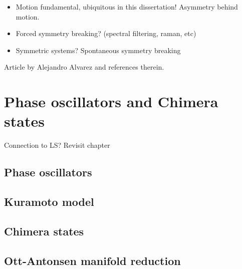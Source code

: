 \begin{itemize}
    \item Motion fundamental, ubiquitous in this dissertation! Asymmetry behind motion.
    \item Forced symmetry breaking? (spectral filtering, raman, etc)
    \item Symmetric systems? Spontaneous symmetry breaking
\end{itemize}

Article by Alejandro Alvarez and references therein.

\section{Phase oscillators and Chimera states}
Connection to LS?  Revisit chapter
\subsection{Phase oscillators}
\label{sec:phase_oscillators}

\subsection{Kuramoto model}

\subsection{Chimera states}

\subsection{Ott-Antonsen manifold reduction}